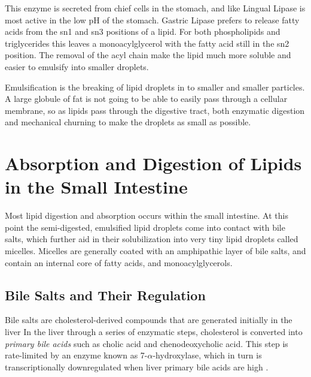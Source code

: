 \documentclass{tufte-handout}
\begin{document}
  This enzyme is secreted from chief cells in the stomach, and like Lingual Lipase is most active in the low pH of the stomach.  Gastric Lipase prefers to release fatty acids from the sn1 and sn3 positions of a lipid.  For both phospholipids and triglycerides this leaves a monoacylglycerol with the fatty acid still in the sn2 position.  The removal of the acyl chain make the lipid much more soluble and easier to emulsify into smaller droplets.

  Emulsification is the breaking of lipid droplets in to smaller and smaller particles.  A large globule of fat is not going to be able to easily pass through a cellular membrane, so as lipids pass through the digestive tract, both enzymatic digestion and mechanical churning to make the droplets as small as possible.

\section{Absorption and Digestion of Lipids in the Small Intestine}

Most lipid digestion and absorption occurs within the small intestine.  At this point the semi-digested, emulsified lipid droplets come into contact with bile salts, which further aid in their solubilization into very tiny lipid droplets called micelles.  Micelles are generally coated with an amphipathic layer of bile salts, and contain an internal core of fatty acids, and monoacylglycerols.

\subsection{Bile Salts and Their Regulation}

Bile salts are cholesterol-derived compounds that are generated initially in the liver  In the liver through a series of enzymatic steps, cholesterol is converted into \emph{primary bile acids} such as cholic acid and chenodeoxycholic acid.  This step is rate-limited by an enzyme known as 7-$\alpha$-hydroxylase, which in turn is transcriptionally downregulated when liver primary bile acids are high \citep{Ramirez1994}.
\end{document}
